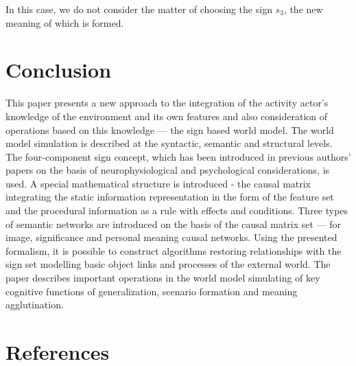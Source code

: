 \documentclass[review]{elsarticle}
\begin{document}
In this case, we do not consider the matter of choosing the sign $s_3$, the new meaning of which is formed.

\section*{Conclusion}
This paper presents a new approach to the integration of the activity actor’s knowledge of the environment and its own features and also consideration of operations based on this knowledge --- the sign based world model. The world model simulation is described at the syntactic, semantic and structural levels. The four-component sign concept, which has been introduced in previous authors’ papers on the basis of neurophysiological and psychological considerations, is used. A special mathematical structure is introduced - the causal matrix integrating the static information representation in the form of the feature set and the procedural information as a rule with effects and conditions. Three types of semantic networks are introduced on the basis of the causal matrix set --- for image, significance and personal meaning causal networks. Using the presented formalism, it is possible to construct algorithms restoring relationships with the sign set modelling basic object links and processes of the external world. The paper describes important operations in the world model simulating of key cognitive functions of generalization, scenario formation and meaning agglutination.

\section*{References}


\end{document}
